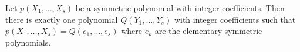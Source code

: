 Let $p(X_1, \ldots, X_s)$ be a symmetric polynomial with integer coefficients. Then there is exactly one polynomial $Q(Y_1, \ldots, Y_s)$ with integer coefficients such that $p(X_1, \ldots, X_s) = Q(e_1, \ldots, e_s)$ where $e_k$ are the elementary symmetric polynomials.
